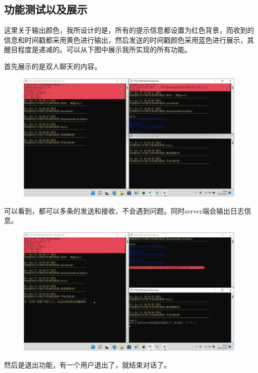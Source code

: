 \documentclass[UTF8,a4paper,10pt]{ctexart}
\begin{document}
\subsection{功能测试以及展示}
这里关于输出颜色，我所设计的是，所有的提示信息都设置为红色背景，而收到的信息和时间戳都采用黄色进行输出，然后发送的时间戳颜色采用蓝色进行展示，其醒目程度是递减的。可以从下图中展示我所实现的所有功能。

首先展示的是双人聊天的内容。
\begin{figure}[H]
    \centering
    \includegraphics[scale=0.4]{2.png}
    \label{fig:2}
\end{figure}
可以看到，都可以多条的发送和接收，不会遇到问题。同时server端会输出日志信息。
\begin{figure}[H]
    \centering
    \includegraphics[scale=0.4]{3.png}
    \label{fig:3}
\end{figure}
然后是退出功能，有一个用户退出了，就结束对话了。
\end{document}
